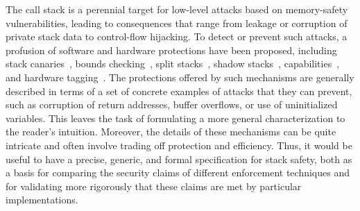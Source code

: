 \documentclass[acmsmall,review,anonymous]{acmart}\settopmatter{printfolios=true,printccs=false,printacmref=false}
\begin{document}
The call stack is a perennial target for low-level attacks
based on memory-safety vulnerabilities, leading to consequences
that range from leakage or corruption of private stack data to
control-flow hijacking. To detect or prevent such attacks, a profusion of
software and hardware protections have been proposed,
%
including stack canaries~\citep{Cowan+98},
bounds checking~\citep{NagarakatteZMZ09,NagarakatteZMZ10,DeviettiBMZ08},
split stacks~\citep{Kuznetsov+14},
shadow stacks~\citep{Dang+15,Shanbhogue+19},
capabilities~\citep{Woodruff+14,Chisnall+15,Skorstengaard+19,Skorstengaard+19b,Tsampas+19,Georges+21},
and hardware tagging~\citep{DBLP:conf/sp/RoesslerD18}. \ifaftersubmission{}
\fi
%
The protections offered by such mechanisms are generally described in terms
of a set of concrete examples of attacks that they can prevent, such as corruption
of return addresses, buffer overflows, or use of uninitialized variables. This leaves the
task of formulating a more general characterization to the reader's intuition.
Moreover, the details of these mechanisms can be quite intricate
and often involve trading off protection and efficiency.
Thus, it would be useful to have a precise, generic, and formal
specification for stack
safety, both as a basis for comparing the security claims of different
enforcement techniques and for validating more rigorously that these claims
are met by particular implementations.
\end{document}
